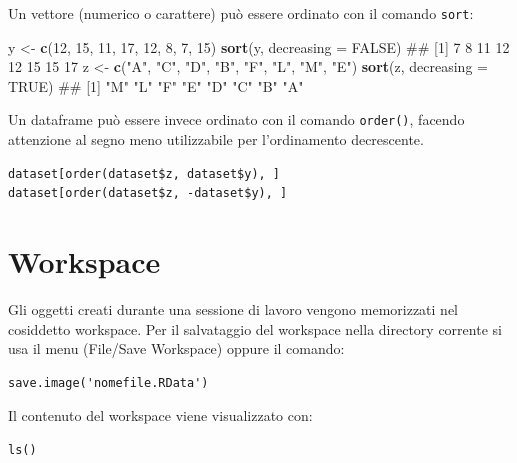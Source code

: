 \documentclass[a4paper,12pt,oneside]{book}
\newenvironment{Shaded}{\begin{snugshade}}{\end{snugshade}}
\newcommand{\KeywordTok}[1]{\textcolor[rgb]{0.13,0.29,0.53}{\textbf{#1}}}
\newcommand{\DataTypeTok}[1]{\textcolor[rgb]{0.13,0.29,0.53}{#1}}
\newcommand{\DecValTok}[1]{\textcolor[rgb]{0.00,0.00,0.81}{#1}}
\newcommand{\StringTok}[1]{\textcolor[rgb]{0.31,0.60,0.02}{#1}}
\newcommand{\OtherTok}[1]{\textcolor[rgb]{0.56,0.35,0.01}{#1}}
\newcommand{\NormalTok}[1]{#1}
\theoremstyle{definition}
\theoremstyle{definition}
\theoremstyle{definition}
\theoremstyle{remark}
\begin{document}
Un vettore (numerico o carattere) può essere ordinato con il comando
\texttt{sort}:

\begin{Shaded}
\begin{Highlighting}[]
\NormalTok{y  <-}\StringTok{  }\KeywordTok{c}\NormalTok{(}\DecValTok{12}\NormalTok{, }\DecValTok{15}\NormalTok{, }\DecValTok{11}\NormalTok{, }\DecValTok{17}\NormalTok{, }\DecValTok{12}\NormalTok{, }\DecValTok{8}\NormalTok{, }\DecValTok{7}\NormalTok{, }\DecValTok{15}\NormalTok{)}
\KeywordTok{sort}\NormalTok{(y, }\DataTypeTok{decreasing =} \OtherTok{FALSE}\NormalTok{)}
\NormalTok{## [1]  7  8 11 12 12 15 15 17}
\NormalTok{z  <-}\StringTok{  }\KeywordTok{c}\NormalTok{(}\StringTok{"A"}\NormalTok{, }\StringTok{"C"}\NormalTok{, }\StringTok{"D"}\NormalTok{, }\StringTok{"B"}\NormalTok{, }\StringTok{"F"}\NormalTok{, }\StringTok{"L"}\NormalTok{, }\StringTok{"M"}\NormalTok{, }\StringTok{"E"}\NormalTok{)}
\KeywordTok{sort}\NormalTok{(z, }\DataTypeTok{decreasing =} \OtherTok{TRUE}\NormalTok{)}
\NormalTok{## [1] "M" "L" "F" "E" "D" "C" "B" "A"}
\end{Highlighting}
\end{Shaded}

Un dataframe può essere invece ordinato con il comando \texttt{order()},
facendo attenzione al segno meno utilizzabile per l'ordinamento
decrescente.

\begin{verbatim}
dataset[order(dataset$z, dataset$y), ]
dataset[order(dataset$z, -dataset$y), ]
\end{verbatim}

\section*{Workspace}\label{workspace}

Gli oggetti creati durante una sessione di lavoro vengono memorizzati
nel cosiddetto workspace. Per il salvataggio del workspace nella
directory corrente si usa il menu (File/Save Workspace) oppure il
comando:

\begin{verbatim}
save.image('nomefile.RData')
\end{verbatim}

Il contenuto del workspace viene visualizzato con:

\begin{verbatim}
ls()
\end{verbatim}
\end{document}
